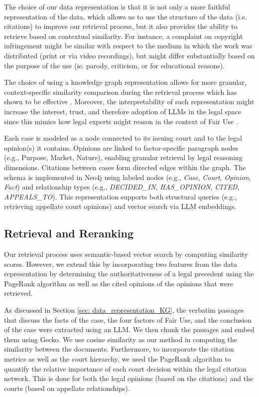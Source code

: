 The choice of our data representation is that it is not only a more faithful representation of the data, which allows us to use the structure of the data (i.e. citations) to improve our retrieval process, but it also provides the ability to retrieve based on contextual similarity. For instance, a complaint on copyright infringement might be similar with respect to the medium in which the work was distributed (print or via video recordings), but might differ substantially based on the purpose of the use (ie. parody, criticism, or for educational reasons). 

The choice of using a knowledge graph representation allows for more granular, context-specific similarity comparison during the retrieval process which has shown to be effective \cite{02_DenseRetrieval, 03b_SemanticRepresentationContextual}. Moreover, the interpretability of such representation might increase the interest, trust, and therefore adoption of LLMs in the legal space since this mimics how legal experts might reason in the context of Fair Use \cite{18_TrustAIExplainability}.

Each case is modeled as a node connected to its issuing court and to the legal opinion(s) it contains. Opinions are linked to factor-specific paragraph nodes (e.g., Purpose, Market, Nature), enabling granular retrieval by legal reasoning dimensions. Citations between cases form directed edges within the graph. The schema is implemented in Neo4j using labeled nodes (e.g., \textit{Case}, \textit{Court}, \textit{Opinion}, \textit{Fact}) and relationship types (e.g., \textit{DECIDED\_IN}, \textit{HAS\_OPINION}, \textit{CITED}, \textit{APPEALS\_TO}). This representation supports both structural queries (e.g., retrieving appellate court opinions) and vector search via LLM embeddings.

\subsection{Retrieval and Reranking}

Our retrieval process uses semantic-based vector search by computing similarity scores. However, we extend this by incorporating two features from the data representation by determining the authoritativeness of a legal precedent using the PageRank algorithm as well as the cited opinions of the opinions that were retrieved.

As discussed in Section \ref{sec: data_representation_KG}, the verbatim passages that discuss the facts of the case, the four factors of Fair Use, and the conclusion of the case were extracted using an LLM. We then chunk the passages and embed them using Gecko. We use cosine similarity as our method in computing the similarity between the documents. Furthermore, to incorporate the citation metrics as well as the court hierarchy, we used the PageRank algorithm to quantify the relative importance of each court decision within the legal citation network. This is done for both the legal opinions (based on the citations) and the courts (based on appellate relationships). 

